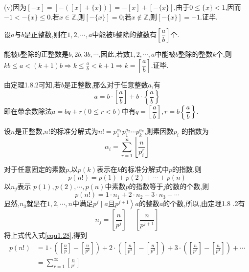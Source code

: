(v)因为$[-x]=[-([x]+\{x\})]=-[x]+[-\{x\}]$,由于$0 \leqslant\{x\}<1$,因而$-1<-\{x\} \leqslant 0$.若$x \in \mathbb{Z}$,则$[-\{x\}]=0$;若$x \notin \mathbb{Z}$,则$[-\{x\}]=-1$.证毕.

\theorem 设$a$与$b$是正整数,则在$1,2, \cdots, a$中能被$b$整除的整数有$\left[\dfrac{a}{b}\right]$个.

\proof 能被$b$整除的正整数是$b, 2 b, 3 b, \cdots$,因此,若数$1,2, \cdots, a$中能被$b$整除的整数$k$个,则$k b \leqslant a<(k+1) b \Rightarrow k \leqslant \frac{a}{b}<k+1 \Rightarrow k=\left[\dfrac{a}{b}\right]$.证毕.

\entry 由定理1.8.2可知,若$b$是正整数,那么对于任意整数$a$,有
\begin{equation*}
	a=b \cdot\left[\frac{a}{b}\right]+b \cdot\left\{\frac{a}{b}\right\}
\end{equation*}
即在带余数除法$a=b q+r(0 \leqslant r<b)$中有$q=\left[\dfrac{a}{b}\right], r=b\left\{\dfrac{a}{b}\right\}$.

\theorem 设$n$是正整数,$n !$的标准分解式为$n !=p_{1}^{\alpha_{1}} p_{1}^{a_{2}} \cdots p_{k}^{a_{k}}$,则素因数$p_{i}$ 的指数为
\begin{equation}\label{equ1.27}
	\alpha_{i}=\sum_{r=1}^{\infty}\left[\frac{n}{p_{i}^{r}}\right]
\end{equation}

\proof 对于任意固定的素数$p$,以$p(k)$表示在$k$的标准分解式中$p$的指数,则
\begin{equation*}
	p(n !)=p(1)+p(2)+\cdots+p(n)
\end{equation*}
以$n_{j}$表示 $p(1), p(2), \cdots, p(n)$中素数$p$的指数等于$j$的数的个数,则
\begin{equation}\label{equ1.28}
	p(n !)=1 \cdot n_{1}+2 \cdot n_{2}+3 \cdot n_{3}+\cdots
\end{equation}
显然,$n_{3}$就是在$1,2, \cdots, n$中满足$p^{j} \mid a$且$\left.p^{j+1}\right\rangle a$的整数$a$的个数,所以,由定理1.8 .2有
\begin{equation*}
	n_{j}=\left[\frac{n}{p^{j}}\right]-\left[\frac{n}{p^{j+1}}\right]
\end{equation*}
将上式代入式\eqref{equ1.28},得到
\begin{equation*}
	\begin{split}
		p(n !)&=1 \cdot\left(\left[\frac{n}{p}\right]-\left[\frac{n}{p^{2}}\right]\right)+2 \cdot\left(\left[\frac{n}{p^{2}}\right]-\left[\frac{n}{p^{3}}\right]\right)+3 \cdot\left(\left[\frac{n}{p^{3}}\right]-\left[\frac{n}{p^{4}}\right]\right)+\cdots\\
		&=\sum_{r=1}^{\infty}\left[\frac{n}{p^{r}}\right]
	\end{split}
\end{equation*}

